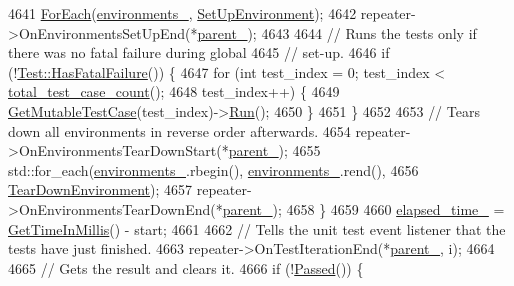 \begin{DoxyCode}
{4641       \hyperlink{namespacetesting_1_1internal_a52f5504ed65d116201ccb8f99a44fd7e}{ForEach}(\hyperlink{classtesting_1_1internal_1_1UnitTestImpl_a1d2320ba1e4e1cad8d624bbb222501fb}{environments\_}, \hyperlink{namespacetesting_1_1internal_a5f5535012d4548788a5d1a4e0f18e19e}{SetUpEnvironment});
4642       repeater->OnEnvironmentsSetUpEnd(*\hyperlink{classtesting_1_1internal_1_1UnitTestImpl_adabbbc8985202ce655d50746bd383eae}{parent\_});
4643 
4644       \textcolor{comment}{// Runs the tests only if there was no fatal failure during global}
4645       \textcolor{comment}{// set-up.}
4646       \textcolor{keywordflow}{if} (!\hyperlink{classtesting_1_1Test_aa8d0725cfb519f82eaf4fd2d2f46d97d}{Test::HasFatalFailure}()) \{
4647         \textcolor{keywordflow}{for} (\textcolor{keywordtype}{int} test\_index = 0; test\_index < \hyperlink{classtesting_1_1internal_1_1UnitTestImpl_ac1d81d6b146b2dbce460f9a0a57d4f9e}{total\_test\_case\_count}();
4648              test\_index++) \{
4649           \hyperlink{classtesting_1_1internal_1_1UnitTestImpl_a2ca71a08060037357fc7e1a406b89add}{GetMutableTestCase}(test\_index)->\hyperlink{classtesting_1_1TestCase_a6f5b3724cd5a8e446cd48a6150d08cde}{Run}();
4650         \}
4651       \}
4652 
4653       \textcolor{comment}{// Tears down all environments in reverse order afterwards.}
4654       repeater->OnEnvironmentsTearDownStart(*\hyperlink{classtesting_1_1internal_1_1UnitTestImpl_adabbbc8985202ce655d50746bd383eae}{parent\_});
4655       std::for\_each(\hyperlink{classtesting_1_1internal_1_1UnitTestImpl_a1d2320ba1e4e1cad8d624bbb222501fb}{environments\_}.rbegin(), \hyperlink{classtesting_1_1internal_1_1UnitTestImpl_a1d2320ba1e4e1cad8d624bbb222501fb}{environments\_}.rend(),
4656                     \hyperlink{namespacetesting_1_1internal_ac467e871e4781da3f5ebed2a4465aec4}{TearDownEnvironment});
4657       repeater->OnEnvironmentsTearDownEnd(*\hyperlink{classtesting_1_1internal_1_1UnitTestImpl_adabbbc8985202ce655d50746bd383eae}{parent\_});
4658     \}
4659 
4660     \hyperlink{classtesting_1_1internal_1_1UnitTestImpl_a06e0445298c6026bee71bb2bb7aae604}{elapsed\_time\_} = \hyperlink{namespacetesting_1_1internal_ae66b46943a429e6efb1db456d4cae90c}{GetTimeInMillis}() - start;
4661 
4662     \textcolor{comment}{// Tells the unit test event listener that the tests have just finished.}
4663     repeater->OnTestIterationEnd(*\hyperlink{classtesting_1_1internal_1_1UnitTestImpl_adabbbc8985202ce655d50746bd383eae}{parent\_}, i);
4664 
4665     \textcolor{comment}{// Gets the result and clears it.}
4666     \textcolor{keywordflow}{if} (!\hyperlink{classtesting_1_1internal_1_1UnitTestImpl_ae8e461369acfec902da382bc02297fe5}{Passed}()) \{
}
\end{DoxyCode}
